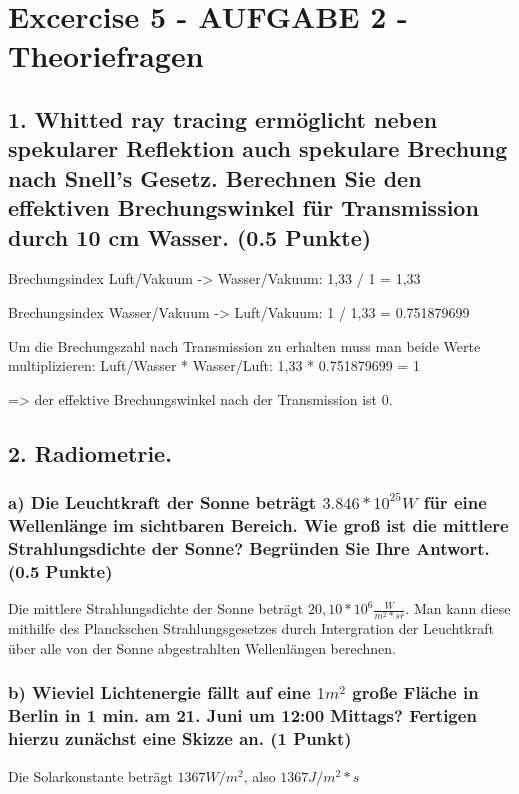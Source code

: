\documentclass[12pt]{scrreprt}
\begin{document}


\chapter*{Excercise 5 - AUFGABE 2 - Theoriefragen}

\section*{1. Whitted ray tracing ermöglicht neben spekularer Reflektion auch spekulare Brechung nach Snell's Gesetz. Berechnen Sie den effektiven Brechungswinkel für Transmission durch 10 cm Wasser. (0.5 Punkte)}

Brechungsindex Luft/Vakuum -> Wasser/Vakuum: 1,33 / 1 = 1,33

Brechungsindex Wasser/Vakuum -> Luft/Vakuum: 1 / 1,33 =  0.751879699

Um die Brechungszahl nach Transmission zu erhalten muss man beide Werte multiplizieren: Luft/Wasser * Wasser/Luft: 1,33 * 0.751879699 = 1

=> der effektive Brechungswinkel nach der Transmission ist 0.


\section*{2. Radiometrie.}

\subsection*{a) Die Leuchtkraft der Sonne beträgt $3.846 * 10^{25} W$ für eine Wellenlänge im sichtbaren Bereich. Wie groß ist die mittlere Strahlungsdichte der Sonne? Begründen Sie Ihre Antwort. (0.5 Punkte)}

Die mittlere Strahlungsdichte der Sonne beträgt $20,10 * 10^6 \frac{W}{m^2 * sr}$. Man kann diese mithilfe des Planckschen Strahlungsgesetzes durch Intergration der Leuchtkraft über alle von der Sonne abgestrahlten Wellenlängen berechnen.


\subsection*{b) Wieviel Lichtenergie fällt auf eine $1 m^2$ große Fläche in Berlin in 1 min. am 21. Juni um 12:00 Mittags? Fertigen hierzu zunächst eine Skizze an. (1 Punkt)}

Die Solarkonstante beträgt $1367 W/m^2$, also $1367 J/m^2 * s$
\end{document}
